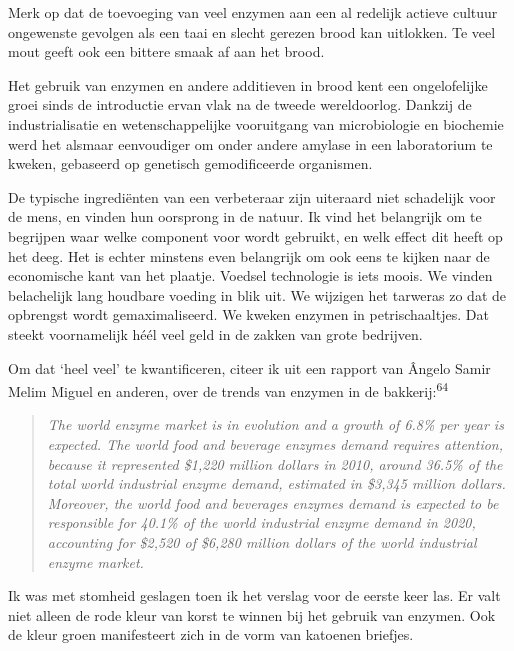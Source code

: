 \documentclass[
  11pt,
  dutch,
]{memoir}
\begin{document}
Merk op dat de toevoeging van veel enzymen aan een al redelijk actieve
cultuur ongewenste gevolgen als een taai en slecht gerezen brood kan
uitlokken. Te veel mout geeft ook een bittere smaak af aan het brood.

Het gebruik van enzymen en andere additieven in brood kent een
ongelofelijke groei sinds de introductie ervan vlak na de tweede
wereldoorlog. Dankzij de industrialisatie en wetenschappelijke
vooruitgang van microbiologie en biochemie werd het alsmaar eenvoudiger
om onder andere amylase in een laboratorium te kweken, gebaseerd op
genetisch gemodificeerde organismen.

De typische ingrediënten van een verbeteraar zijn uiteraard niet
schadelijk voor de mens, en vinden hun oorsprong in de natuur. Ik vind
het belangrijk om te begrijpen waar welke component voor wordt gebruikt,
en welk effect dit heeft op het deeg. Het is echter minstens even
belangrijk om ook eens te kijken naar de economische kant van het
plaatje. Voedsel technologie is iets moois. We vinden belachelijk lang
houdbare voeding in blik uit. We wijzigen het tarweras zo dat de
opbrengst wordt gemaximaliseerd. We kweken enzymen in petrischaaltjes.
Dat steekt voornamelijk héél veel geld in de zakken van grote bedrijven.

Om dat `heel veel' te kwantificeren, citeer ik uit een rapport van
Ângelo Samir Melim Miguel en anderen, over de trends van enzymen in de
bakkerij:\textsuperscript{64}

\begin{quote}
\emph{The world enzyme market is in evolution and a growth of 6.8\% per
year is expected. The world food and beverage enzymes demand requires
attention, because it represented \$1,220 million dollars in 2010,
around 36.5\% of the total world industrial enzyme demand, estimated in
\$3,345 million dollars. Moreover, the world food and beverages enzymes
demand is expected to be responsible for 40.1\% of the world industrial
enzyme demand in 2020, accounting for \$2,520 of \$6,280 million dollars
of the world industrial enzyme market.}
\end{quote}

Ik was met stomheid geslagen toen ik het verslag voor de eerste keer
las. Er valt niet alleen de rode kleur van korst te winnen bij het
gebruik van enzymen. Ook de kleur groen manifesteert zich in de vorm van
katoenen briefjes.
\end{document}
